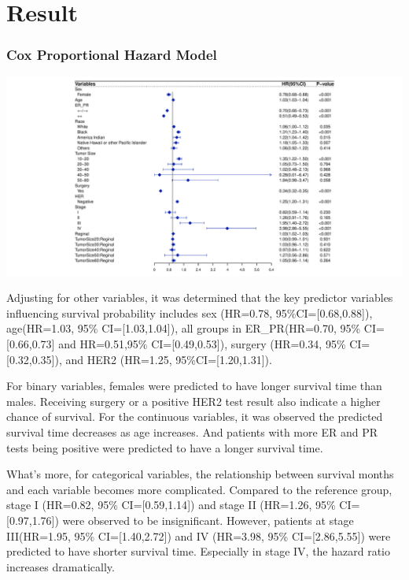 \documentclass[
  12pt,
]{article}
\begin{document}
\hypertarget{result}{%
\section{Result}\label{result}}

\hypertarget{cox-proportional-hazard-model}{%
\subsubsection{Cox Proportional Hazard
Model}\label{cox-proportional-hazard-model}}

\includegraphics{report_files/figure-latex/unnamed-chunk-2-1.pdf}

Adjusting for other variables, it was determined that the key predictor
variables influencing survival probability includes sex (HR=0.78,
95\%CI={[}0.68,0.88{]}), age(HR=1.03, 95\% CI={[}1.03,1.04{]}), all
groups in ER\_PR(HR=0.70, 95\% CI={[}0.66,0.73{]} and HR=0.51,95\%
CI={[}0.49,0.53{]}), surgery (HR=0.34, 95\% CI={[}0.32,0.35{]}), and
HER2 (HR=1.25, 95\%CI={[}1.20,1.31{]}).

For binary variables, females were predicted to have longer survival
time than males. Receiving surgery or a positive HER2 test result also
indicate a higher chance of survival. For the continuous variables, it
was observed the predicted survival time decreases as age increases. And
patients with more ER and PR tests being positive were predicted to have
a longer survival time.

What's more, for categorical variables, the relationship between
survival months and each variable becomes more complicated. Compared to
the reference group, stage I (HR=0.82, 95\% CI={[}0.59,1.14{]}) and
stage II (HR=1.26, 95\% CI={[}0.97,1.76{]}) were observed to be
insignificant. However, patients at stage III(HR=1.95, 95\%
CI={[}1.40,2.72{]}) and IV (HR=3.98, 95\% CI={[}2.86,5.55{]}) were
predicted to have shorter survival time. Especially in stage IV, the
hazard ratio increases dramatically.
\end{document}

